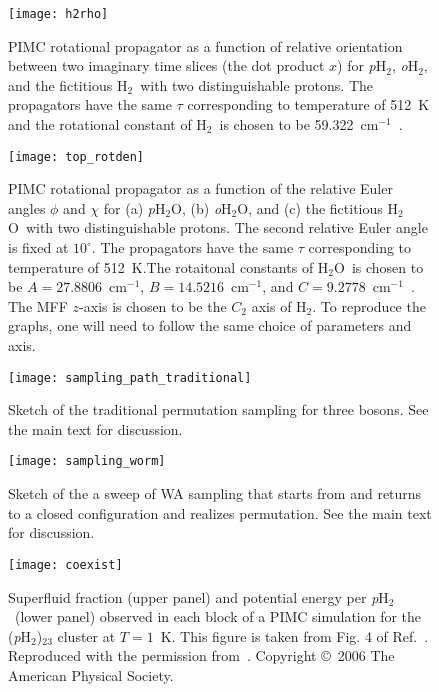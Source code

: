 \documentclass[12pt]{iopart}
\newcommand{\water}{H$_2$O}
\newcommand{\pwater}{{\em p}H$_2$O}
\newcommand{\owater}{{\em o}H$_2$O}
\newcommand{\hydrogen}{H$_2$}
\newcommand{\wno}{cm$^{-1}$}
\newcommand{\phtwo}{{\em p}H$_2$}
\newcommand{\ohtwo}{{\em o}H$_2$}
\begin{document}
\begin{figure}[h]
\centerline {\texttt{[image: h2rho]}}
\caption{PIMC rotational propagator as a function of relative orientation between two imaginary time slices (the dot product $x$) for \phtwo, \ohtwo, and the fictitious \hydrogen~with two distinguishable protons. The propagators have the same $\tau$ corresponding to temperature of 512~K and the rotational constant of \hydrogen~is chosen to be 59.322~\wno~\cite{h2_b_59.3}.}
\label{fig:h2_rho}
\end{figure}

\begin{figure}[h]
\centerline {\texttt{[image: top\_rotden]}}
\caption{PIMC rotational propagator as a function of the relative Euler angles $\phi$ and $\chi$ for (a) \pwater, (b) \owater, and (c) the fictitious \water~with two distinguishable protons. The second relative Euler angle is fixed at $10^\circ$. The propagators have the same $\tau$ corresponding to temperature of 512~K.The rotaitonal constants of \water~is chosen to be $A=27.8806$~\wno, $B=14.5216$~\wno, and $C=9.2778$~\wno~\cite{vanderAvoird:2011gn}. The MFF $z$-axis is chosen to be the $C_2$ axis of \hydrogen. To reproduce the graphs, one will need to follow the same choice of parameters and axis.} 
\label{fig:h2o_rotden}
\end{figure}

\begin{figure}[h] 
\centerline {\texttt{[image: sampling\_path\_traditional]}}
\caption{Sketch of the traditional permutation sampling for three bosons. See the main text for discussion. } 
\label{fig:sampath1}
\end{figure}

\begin{figure}[h]
\centerline {\texttt{[image: sampling\_worm]}}
\caption{Sketch of the a sweep of WA sampling that starts from and returns to a closed configuration and realizes permutation. See the main text for discussion.} 
\label{fig:sampath2}
\end{figure}


\begin{figure}[h] 
\centerline {\texttt{[image: coexist]}}
\caption{Superfluid fraction (upper panel) and potential energy per \phtwo~(lower panel) observed in each block of a PIMC simulation for the (\phtwo)$_{23}$ cluster at $T=1$~K. This figure is taken from Fig. 4 of Ref.~\cite{Boninsegni_pH2_melting}. Reproduced with the permission from~\cite{Boninsegni_pH2_melting}. Copyright \copyright~2006 The American Physical Society.} 
\label{fig:coexist}
\end{figure}
\end{document}

